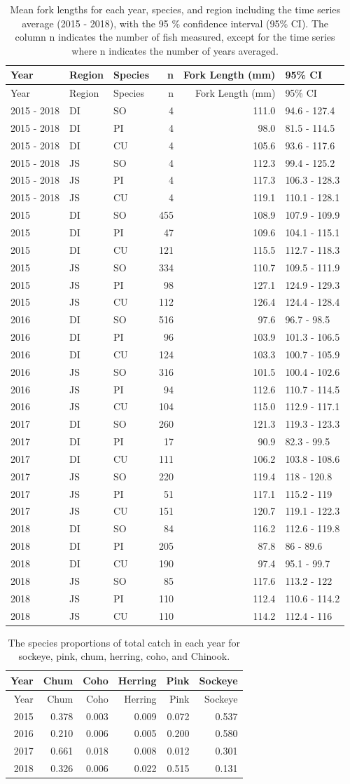 \documentclass[fleqn,10pt]{wlpeerj} %
\begin{document}
\begin{longtable}[]{@{}lllrrl@{}}
\caption{\label{tab:length} Mean fork lengths for each year, species, and
region including the time series average (2015 - 2018), with the 95 \%
confidence interval (95\% CI). The column n indicates the number of fish
measured, except for the time series where n indicates the number of
years averaged.}\tabularnewline
\toprule
Year & Region & Species & n & Fork Length (mm) & 95\% CI\tabularnewline
\midrule
\endfirsthead
\toprule
Year & Region & Species & n & Fork Length (mm) & 95\% CI\tabularnewline
\midrule
\endhead
2015 - 2018 & DI & SO & 4 & 111.0 & 94.6 - 127.4\tabularnewline
2015 - 2018 & DI & PI & 4 & 98.0 & 81.5 - 114.5\tabularnewline
2015 - 2018 & DI & CU & 4 & 105.6 & 93.6 - 117.6\tabularnewline
2015 - 2018 & JS & SO & 4 & 112.3 & 99.4 - 125.2\tabularnewline
2015 - 2018 & JS & PI & 4 & 117.3 & 106.3 - 128.3\tabularnewline
2015 - 2018 & JS & CU & 4 & 119.1 & 110.1 - 128.1\tabularnewline
2015 & DI & SO & 455 & 108.9 & 107.9 - 109.9\tabularnewline
2015 & DI & PI & 47 & 109.6 & 104.1 - 115.1\tabularnewline
2015 & DI & CU & 121 & 115.5 & 112.7 - 118.3\tabularnewline
2015 & JS & SO & 334 & 110.7 & 109.5 - 111.9\tabularnewline
2015 & JS & PI & 98 & 127.1 & 124.9 - 129.3\tabularnewline
2015 & JS & CU & 112 & 126.4 & 124.4 - 128.4\tabularnewline
2016 & DI & SO & 516 & 97.6 & 96.7 - 98.5\tabularnewline
2016 & DI & PI & 96 & 103.9 & 101.3 - 106.5\tabularnewline
2016 & DI & CU & 124 & 103.3 & 100.7 - 105.9\tabularnewline
2016 & JS & SO & 316 & 101.5 & 100.4 - 102.6\tabularnewline
2016 & JS & PI & 94 & 112.6 & 110.7 - 114.5\tabularnewline
2016 & JS & CU & 104 & 115.0 & 112.9 - 117.1\tabularnewline
2017 & DI & SO & 260 & 121.3 & 119.3 - 123.3\tabularnewline
2017 & DI & PI & 17 & 90.9 & 82.3 - 99.5\tabularnewline
2017 & DI & CU & 111 & 106.2 & 103.8 - 108.6\tabularnewline
2017 & JS & SO & 220 & 119.4 & 118 - 120.8\tabularnewline
2017 & JS & PI & 51 & 117.1 & 115.2 - 119\tabularnewline
2017 & JS & CU & 151 & 120.7 & 119.1 - 122.3\tabularnewline
2018 & DI & SO & 84 & 116.2 & 112.6 - 119.8\tabularnewline
2018 & DI & PI & 205 & 87.8 & 86 - 89.6\tabularnewline
2018 & DI & CU & 190 & 97.4 & 95.1 - 99.7\tabularnewline
2018 & JS & SO & 85 & 117.6 & 113.2 - 122\tabularnewline
2018 & JS & PI & 110 & 112.4 & 110.6 - 114.2\tabularnewline
2018 & JS & CU & 110 & 114.2 & 112.4 - 116\tabularnewline
\bottomrule
\end{longtable}

\begin{longtable}[]{@{}rrrrrr@{}}
\caption{\label{tab:proptable} The species proportions of total catch in
each year for sockeye, pink, chum, herring, coho, and
Chinook.}\tabularnewline
\toprule
Year & Chum & Coho & Herring & Pink & Sockeye\tabularnewline
\midrule
\endfirsthead
\toprule
Year & Chum & Coho & Herring & Pink & Sockeye\tabularnewline
\midrule
\endhead
2015 & 0.378 & 0.003 & 0.009 & 0.072 & 0.537\tabularnewline
2016 & 0.210 & 0.006 & 0.005 & 0.200 & 0.580\tabularnewline
2017 & 0.661 & 0.018 & 0.008 & 0.012 & 0.301\tabularnewline
2018 & 0.326 & 0.006 & 0.022 & 0.515 & 0.131\tabularnewline
\bottomrule
\end{longtable}
\end{document}
